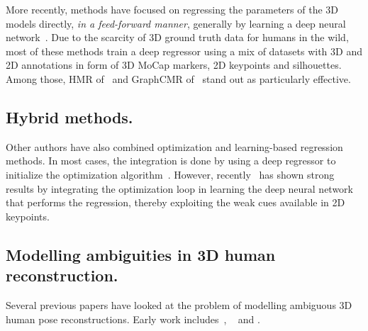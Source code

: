 More recently, methods have focused on regressing the parameters of the 3D models directly, \emph{in a feed-forward manner}, generally by learning a deep neural network~\cite{tan17indirect,tung17self-supervised,omran18neural,pavlakos18learning,kanazawa18end-to-end}.
Due to the scarcity of 3D ground truth data for humans in the wild, most of these methods train a deep regressor using a mix of datasets with 3D and 2D annotations in form of 3D MoCap markers, 2D keypoints and silhouettes. Among those, HMR of~\citet{kanazawa18end-to-end} and GraphCMR of~\citet{kolotouros19convolutional} stand out as particularly effective.

\subsection{Hybrid methods.}

Other authors have also combined optimization and learning-based regression methods.
In most cases, the integration is done by using a deep regressor to initialize the optimization algorithm~\cite{sigal08combined,lassner17unite,rogez18lcr-net,pavlakos18learning,varol18bodynet}.
However, recently~\citet{kolotouros19learning} has shown strong results by integrating the optimization loop in learning the deep neural network that performs the regression, thereby exploiting the weak cues available in 2D keypoints.

\subsection{Modelling ambiguities in 3D human reconstruction.}

Several previous papers have looked at the problem of modelling ambiguous 3D human pose reconstructions. Early work includes~\citet{kinematic-jump-processes}, ~\citet{tracking-3d-human-figures} and \citet{density-prop}. 



